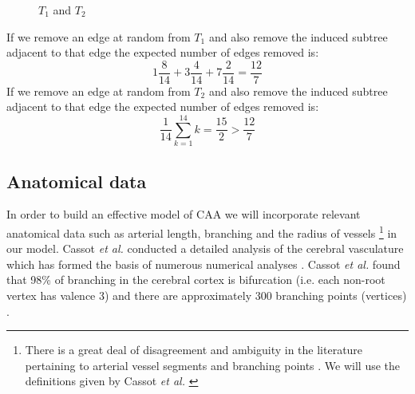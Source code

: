 \documentclass[10pt]{amsart} %
\theoremstyle{definition}
\begin{document}
\begin{figure}[H]
\caption{$T_{1}$ and $T_{2}$}\label{fig:silly}
\end{figure}
If we remove an edge at random from $T_{1}$ and also remove the  induced subtree adjacent to that edge the expected number
of edges removed is:
\begin{equation}
1\frac{8}{14} + 3\frac{4}{14} + 7\frac{2}{14} = \frac{12}{7} 
\end{equation} 
If we remove an edge at random from $T_{2}$ and also remove the  induced subtree adjacent to that edge the expected number of
edges removed is:
\begin{equation}
\frac{1}{14}\sum_{k=1}^{14}k = \frac{15}{2} > \frac{12}{7}
\end{equation}


\subsection{Anatomical data}\label{sec:ana}

In order to build an effective model of CAA we will incorporate relevant anatomical data such as arterial length, branching
and the radius of vessels \footnote{  There is  a great deal of disagreement and ambiguity in the literature pertaining to
arterial vessel segments and branching points \cite{Zamir}.  We will use the definitions given by Cassot \emph{et al.} 
\cite{Cassot}} in our model.
Cassot \emph{et al.} conducted a detailed analysis of the cerebral vasculature which has formed the basis of numerous 
numerical analyses \cite{grinberg,Cassot}. Cassot \emph{et al.} found that 98\% of branching in the cerebral cortex is 
bifurcation  (i.e. each non-root vertex has valence 3) and there are approximately 300 branching points (vertices) \cite{Cassot}. 
\end{document}
